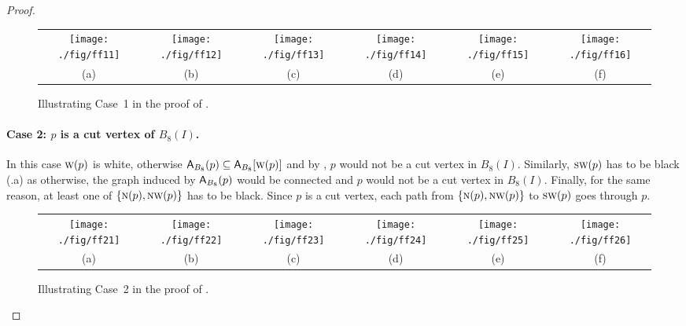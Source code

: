 \documentclass[lotsofwhite,charterfonts]{patmorin}
\newcommand{\N}{\textsc{n}}
\newcommand{\SW}{\textsc{sw}}
\newcommand{\W}{\textsc{w}}
\newcommand{\NW}{\textsc{nw}}
\newcommand{\A}[2]{\ensuremath{\protect\textup{\textsf{A}}_{#2}(#1)}}
\newcommand{\AC}[2]{\ensuremath{\protect\textup{\textsf{A}}_{#2}[#1]}}
\newcommand{\se}{\ensuremath{\subseteq}}
\begin{document}
\begin{proof}
\begin{figure}[htbp]
\begin{center}
\begin{tabular}{cccccc}
\texttt{[image: ./fig/ff11]} & 
\texttt{[image: ./fig/ff12]} & 
\texttt{[image: ./fig/ff13]} & 
\texttt{[image: ./fig/ff14]} & 
\texttt{[image: ./fig/ff15]} &
\texttt{[image: ./fig/ff16]}
\\
(a) & (b) & (c) & (d) & (e) & (f)
\end{tabular}
\end{center}
\caption{Illustrating Case~1 in the proof of .}
\end{figure}



\paragraph{Case 2: $p$ is a cut vertex of $B_8(I)$.} In this case $\W(p)$ is white, otherwise $\A{p}{B_8}\se \AC{\W(p)}{B_8}$ and by , $p$ would not be a cut vertex in $B_8(I)$. Similarly, $\SW(p)$ has to be black (.a) as otherwise, the graph induced by $\A{p}{B_8}$ would be connected and $p$ would not be a cut vertex in $B_8(I)$. Finally, for the same reason, at least one of $\{\N(p), \NW(p)\}$ has to be black. Since $p$ is a cut vertex, each path from $\{\N(p), \NW(p)\}$ to $\SW(p)$ goes through $p$.

\begin{figure}[htbp]
\begin{center}
\begin{tabular}{cccccc}
\texttt{[image: ./fig/ff21]} &
\texttt{[image: ./fig/ff22]} &
\texttt{[image: ./fig/ff23]} &
\texttt{[image: ./fig/ff24]} &
\texttt{[image: ./fig/ff25]} &
 \texttt{[image: ./fig/ff26]}
\\
(a) & (b) & (c) & (d) & (e)& (f)
\end{tabular}
\end{center}
\caption{Illustrating Case~2 in the proof of .}
\end{figure}



\end{proof}
\end{document}
